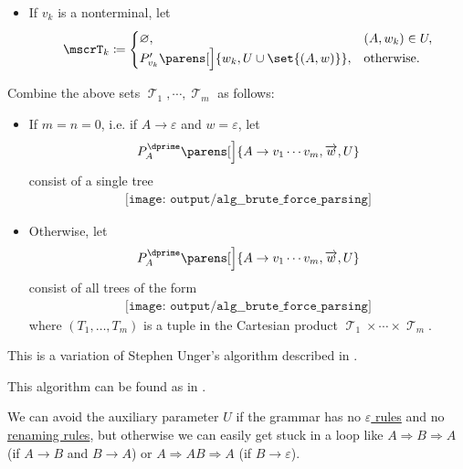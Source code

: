 \begin{algorithm}
\begin{thmenum}
\begin{itemize}
      \item If \( v_k \) is a nonterminal, let
      \begin{equation*}
        \mscrT_k \coloneqq \begin{cases}
          \varnothing,                                         &(A, w_k) \in U, \\
          P'_{v_k}\parens[\Big]{ w_k, U \cup \set{ (A, w) } }, &\T{otherwise.}
        \end{cases}
      \end{equation*}
    \end{itemize}

     Combine the above sets \( \mscrT_1, \cdots, \mscrT_m \) as follows:
    \begin{itemize}
      \item If \( m = n = 0 \), i.e. if \( A \to \varepsilon \) and \( w = \varepsilon \), let
      \begin{equation*}
        P^\dprime_A\parens[\Big]{ A \to v_1 \cdots v_m, \vect w, U }
      \end{equation*}
      consist of a single tree
      \begin{equation*}
        \begin{aligned}
          \texttt{[image: output/alg\_\_brute\_force\_parsing]}
        \end{aligned}
      \end{equation*}

      \item Otherwise, let
      \begin{equation*}
        P^\dprime_A\parens[\Big]{ A \to v_1 \cdots v_m, \vect w, U }
      \end{equation*}
      consist of all trees of the form
      \begin{equation*}
        \begin{aligned}
          \texttt{[image: output/alg\_\_brute\_force\_parsing]}
        \end{aligned}
      \end{equation*}
      where \( (T_1, \ldots, T_m) \) is a tuple in the Cartesian product \( \mscrT_1 \times \cdots \times \mscrT_m \).
    \end{itemize}
  \end{thmenum}
\end{algorithm}
\begin{comments}
  \item This is a variation of Stephen Unger's algorithm described in \cite{Unger1968}.
  \item This algorithm can be found as  in \cite{code}.
  \item We can avoid the auxiliary parameter \( U \) if the grammar has no \hyperref[def:epsilon_free_grammar]{\( \varepsilon \) rules} and no \hyperref[def:renaming_rule]{renaming rules}, but otherwise we can easily get stuck in a loop like \( A \Rightarrow B \Rightarrow A \) (if \( A \to B \) and \( B \to A \)) or \( A \Rightarrow AB \Rightarrow A \) (if \( B \to \varepsilon \)).
\end{comments}

